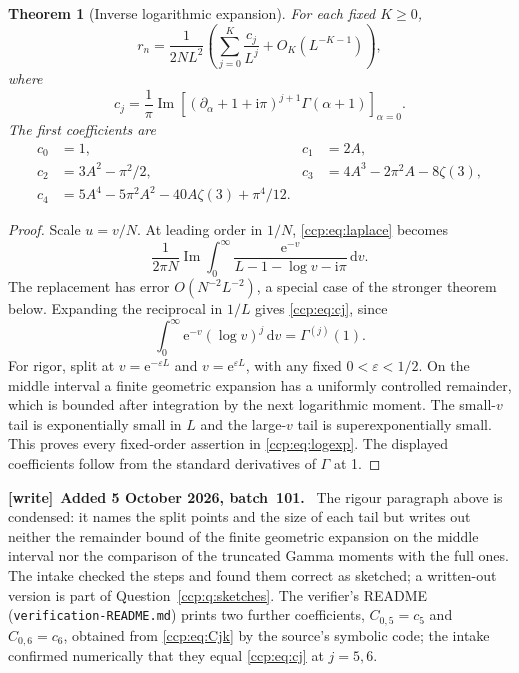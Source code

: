 \documentclass[11pt,letterpaper]{article}
\newtheorem{theorem}{Theorem}[section]
\theoremstyle{remark}\newtheorem{remark}[theorem]{Remark}
\newcommand{\dd}{\,\mathrm d}
\newcommand{\ii}{\mathrm i}
\newcommand{\im}{\operatorname{Im}}
\newcommand{\ee}{\mathrm e}
\newenvironment{writenote}[1][]{\par\smallskip\begingroup\small
 \noindent\textbf{[write]}\if\relax\detokenize{#1}\relax\else~\textbf{#1.}\fi\ }%
 {\par\endgroup\smallskip}
\begin{document}
\begin{theorem}[Inverse logarithmic expansion]\label{ccp:thm:logs}
For each fixed $K\ge0$,
\begin{equation}
r_n=\frac1{2NL^2}\left(\sum_{j=0}^K\frac{c_j}{L^j}
              +O_K(L^{-K-1})\right),\label{ccp:eq:logexp}
\end{equation}
where
\begin{equation}
c_j=\frac1\pi\im\left[(\partial_\alpha+1+\ii\pi)^{j+1}
                 \Gamma(\alpha+1)\right]_{\alpha=0}.\label{ccp:eq:cj}
\end{equation}
The first coefficients are
\begin{align*}
c_0&=1,&c_1&=2A,\\
c_2&=3A^2-\pi^2/2,&
c_3&=4A^3-2\pi^2A-8\zeta(3),\\
c_4&=5A^4-5\pi^2A^2-40A\zeta(3)+\pi^4/12.
\end{align*}
\end{theorem}
\begin{proof}
Scale $u=v/N$. At leading order in $1/N$, \eqref{ccp:eq:laplace} becomes
\begin{equation}
\frac1{2\pi N}\im\int_0^\infty
 \frac{\ee^{-v}}{L-1-\log v-\ii\pi}\dd v.\label{ccp:eq:firstsector}
\end{equation}
The replacement has error $O(N^{-2}L^{-2})$, a special case of the stronger theorem below. Expanding the reciprocal in $1/L$ gives \eqref{ccp:eq:cj}, since
\[
\int_0^\infty\ee^{-v}(\log v)^j\dd v=\Gamma^{(j)}(1).
\]
For rigor, split at $v=\ee^{-\varepsilon L}$ and $v=\ee^{\varepsilon L}$, with any fixed $0<\varepsilon<1/2$. On the middle interval a finite geometric expansion has a uniformly controlled remainder, which is bounded after integration by the next logarithmic moment. The small-$v$ tail is exponentially small in $L$ and the large-$v$ tail is superexponentially small. This proves every fixed-order assertion in \eqref{ccp:eq:logexp}. The displayed coefficients follow from the standard derivatives of $\Gamma$ at 1.
\end{proof}

\begin{writenote}[Added 5 October 2026, batch~101]
The rigour paragraph above is condensed: it names the split points and the
size of each tail but writes out neither the remainder bound of the finite
geometric expansion on the middle interval nor the comparison of the
truncated Gamma moments with the full ones. The intake checked the steps
and found them correct as sketched; a written-out version is part of
Question~\ref{ccp:q:sketches}. The verifier's README
(\nolinkurl{verification-README.md}) prints two further coefficients,
$C_{0,5}=c_5$ and $C_{0,6}=c_6$, obtained from \eqref{ccp:eq:Cjk} by the
source's symbolic code; the intake confirmed numerically that they equal
\eqref{ccp:eq:cj} at $j=5,6$.
\end{writenote}
\end{document}
